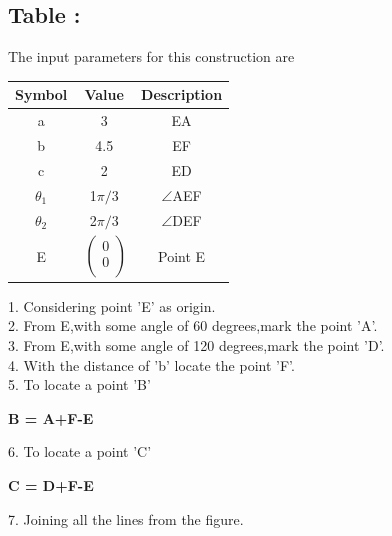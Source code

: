 \documentclass[10pt,a4paper]{report}
\newcommand{\myvec}[1]{\ensuremath{\begin{pmatrix}#1\end{pmatrix}}}
\let\myvec\bf
\begin{document}
\begin{multicols}{2}
\section{Table :}

The input parameters for this construction are 
\begin{center}
\begin{tabular}{|c|c|c|}
	\hline
	\textbf{Symbol}&\textbf{Value}&\textbf{Description}\\
	\hline
	a&3&EA\\
	\hline
	b&4.5&EF\\
	\hline
	c&2&ED\\
	\hline
	${\theta}_1$& 1$\pi/3$&$ \angle $AEF\\ 
	\hline
	${\theta}_2$& 2$\pi/3$&$ \angle $DEF\\ 
	    \hline
	E&$\
	\begin{pmatrix}
		0 \\
		0 \\
	\end{pmatrix}$%
	&Point E\\
	\hline
\end{tabular}
\end{center}

1. Considering point 'E' as origin.\\
2. From E,with some angle of 60 degrees,mark the point 'A'.\\
3. From E,with some angle of 120 degrees,mark the point 'D'.\\
4. With the distance of 'b' locate the point 'F'.\\
5. To locate a point 'B'\\
\begin{center}
    \myvec{ B = A+F-E }
\end{center}
6. To locate a point 'C'\\
\begin{center}
    \myvec{ C = D+F-E }
\end{center}
7. Joining all the lines from the figure.
\vspace{0.5cm}\\

\end{multicols}
\end{document}
